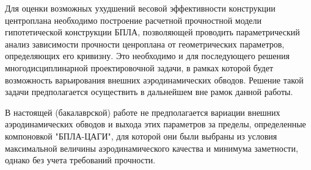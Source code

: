 



Для оценки возможных ухудшений весовой эффективности конструкции центроплана необходимо построение расчетной прочностной модели гипотетической конструкции БПЛА, позволяющей проводить параметрический анализ зависимости прочности ценроплана от геометрических параметров, определяющих его кривизну. Это необходимо и для последующего решения многодисциплинарной проектировочной задачи, в рамках которой будет возможность варьирования внешних аэродинамических обводов. 
Решение такой задачи предполагается осуществить в дальнейшем вне рамок данной работы. 

В настоящей (бакалаврской) работе не предполагается вариации внешних аэродинамических обводов и выхода этих параметров за пределы, определенные компоновкой "БПЛА-ЦАГИ", для которой они были выбраны из условия максимальной величины аэродинамического качества и минимума заметности, однако без учета требований прочности. 





 
  
  

%

